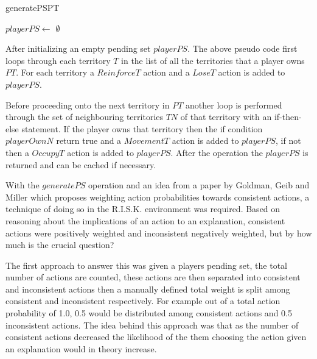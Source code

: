 \documentclass[parskip]{cs4rep}
\begin{document}
\begin{pseudocode}[ruled]{generatePS}{PT}
\begin{algorithm}[H]

$playerPS \gets $ $\emptyset$

\end{algorithm}
\end{pseudocode}

After initializing an empty pending set $playerPS$. The above pseudo code first loops through each territory $T$ in the list of all the territories that a player owns $PT$. For each territory a $ReinforceT$ action and a $LoseT$ action is added to $playerPS$. 

Before proceeding onto the next territory in $PT$ another loop is performed through the set of neighbouring territories $TN$ of that territory with an if-then-else statement. If the player owns that territory then the if condition $playerOwnN$ return true and a $MovementT$ action is added to $playerPS$, if not then a $OccupyT$ action is added to $playerPS$. After the operation the $playerPS$ is returned and can be cached if necessary.

With the $generatePS$ operation and an idea from a paper by Goldman, Geib and Miller \cite{Goldman99anew} which proposes weighting action probabilities towards consistent actions, a technique of doing so in the R.I.S.K. environment was required. Based on reasoning about the implications of an action to an explanation, consistent actions were positively weighted and inconsistent negatively weighted, but by how much is the crucial question?

The first approach to answer this was given a players pending set, the total number of actions are counted, these actions are then separated into consistent and inconsistent actions then a manually defined total weight is split among consistent and inconsistent respectively. For example out of a total action probability of 1.0, 0.5 would be distributed among consistent actions and 0.5 inconsistent actions. The idea behind this approach was that as the number of consistent actions decreased the likelihood of the them choosing the action given an explanation would in theory increase.
\end{document}
